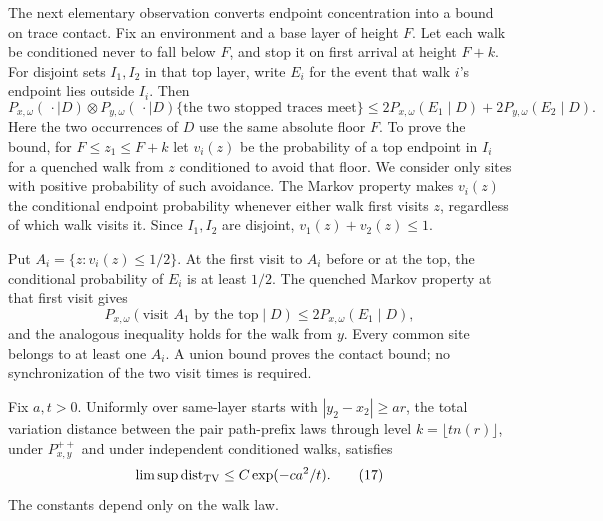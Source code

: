 The next elementary observation converts endpoint concentration into a
bound on trace contact. Fix an environment and a base layer of height
\(F\). Let each walk be conditioned never to fall below \(F\), and
stop it on first arrival at height \(F+k\). For disjoint sets
\(I_1,I_2\) in that top layer, write \(E_i\) for the event that walk
\(i\)'s endpoint lies outside \(I_i\). Then
\[
P_{x,\omega}(\,\cdot\mid D)\otimes
P_{y,\omega}(\,\cdot\mid D)
 \{\text{the two stopped traces meet}\}
\le 2P_{x,\omega}(E_1\mid D)+2P_{y,\omega}(E_2\mid D).
\]
Here the two occurrences of \(D\) use the same absolute floor \(F\).
To prove the bound, for \(F\le z_1\le F+k\) let \(v_i(z)\) be the probability of a top endpoint
in \(I_i\) for a quenched walk from \(z\) conditioned to avoid that
floor. We consider only sites with positive probability of such
avoidance. The Markov property makes \(v_i(z)\) the conditional endpoint
probability whenever either walk first visits \(z\), regardless of
which walk visits it. Since \(I_1,I_2\) are disjoint,
\(v_1(z)+v_2(z)\le1\).

Put \(A_i=\{z:v_i(z)\le1/2\}\). At the first visit to \(A_i\) before
or at the top, the conditional probability of \(E_i\) is at least
\(1/2\). The quenched Markov property at that first visit gives
\[
P_{x,\omega}(\text{visit }A_1\text{ by the top}\mid D)
\le2P_{x,\omega}(E_1\mid D),
\]
and the analogous inequality holds for the walk from \(y\). Every common
site belongs to at least one \(A_i\). A union bound proves the contact
bound; no synchronization of the two visit times is required.

\begin{lemma}\label{gauss-off-diagonal}
Fix \(a,t>0\). Uniformly over same-layer starts with
\(|y_2-x_2|\ge ar\), the total variation distance between the pair
path-prefix laws through level \(k=\lfloor tn(r)\rfloor\), under
\(P_{x,y}^{++}\) and under independent conditioned walks, satisfies
\[
\limsup {\rm dist}_{\rm TV}\le C\exp(-ca^2/t).
\tag{17}\label{eq:17}
\]
The constants depend only on the walk law.
\end{lemma}

